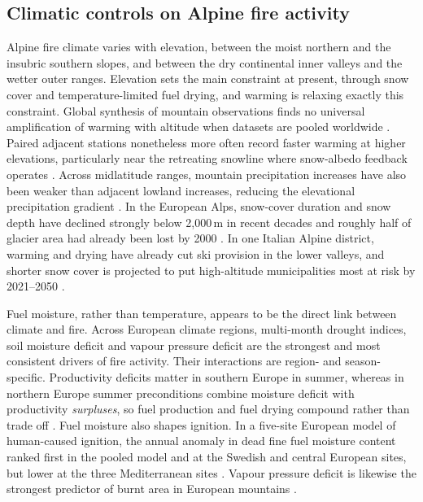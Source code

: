 \documentclass[11pt,a4paper]{article}
\begin{document}
\subsection{Climatic controls on Alpine fire activity}

Alpine fire climate varies with elevation, between the moist northern and the insubric southern slopes, and between the dry continental inner valleys and the wetter outer ranges. Elevation sets the main constraint at present, through snow cover and temperature-limited fuel drying, and warming is relaxing exactly this constraint. Global synthesis of mountain observations finds no universal amplification of warming with altitude when datasets are pooled worldwide \citep{pepin_climate_2022}. Paired adjacent stations nonetheless more often record faster warming at higher elevations, particularly near the retreating snowline where snow-albedo feedback operates \citep{rangwala_climate_2012, pepin_climate_2022}. Across midlatitude ranges, mountain precipitation increases have also been weaker than adjacent lowland increases, reducing the elevational precipitation gradient \citep{pepin_climate_2022}. In the European Alps, snow-cover duration and snow depth have declined strongly below 2{,}000\,m in recent decades and roughly half of glacier area had already been lost by 2000 \citep{pepin_climate_2022}. In one Italian Alpine district, warming and drying have already cut ski provision in the lower valleys, and shorter snow cover is projected to put high-altitude municipalities most at risk by 2021--2050 \citep{pede_mountain_2022}.

Fuel moisture, rather than temperature, appears to be the direct link between climate and fire. Across European climate regions, multi-month drought indices, soil moisture deficit and vapour pressure deficit are the strongest and most consistent drivers of fire activity. Their interactions are region- and season-specific. Productivity deficits matter in southern Europe in summer, whereas in northern Europe summer preconditions combine moisture deficit with productivity \emph{surpluses}, so fuel production and fuel drying compound rather than trade off \citep{miller_compounding_2025}. Fuel moisture also shapes ignition. In a five-site European model of human-caused ignition, the annual anomaly in dead fine fuel moisture content ranked first in the pooled model and at the Swedish and central European sites, but lower at the three Mediterranean sites \citep{gelabert_assessing_2025}. Vapour pressure deficit is likewise the strongest predictor of burnt area in European mountains \citep{beloiu_climatedriven_2026}.
\end{document}
